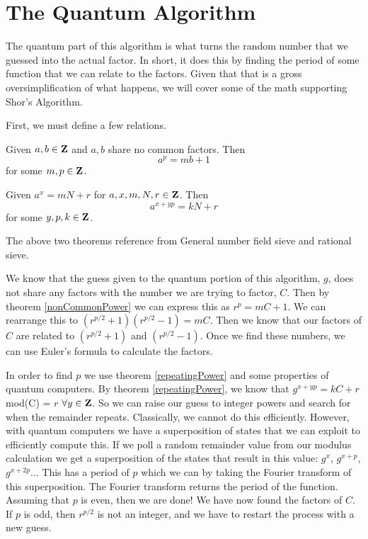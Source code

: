 \documentclass[a4paper]{article}
\begin{document}
\section{The Quantum Algorithm}
\label{quantumSec}

The quantum part of this algorithm is what turns the random number that we guessed into the actual factor. In short, it does this by finding the period of some function that we can relate to the factors. Given that that is a gross oversimplification of what happens, we will cover some of the math supporting Shor's Algorithm. 

First, we must define a few relations. 


\begin{theorem}

Given $a,b \in \mathbf{Z}$ and $a,b$ share no common factors. Then 
$$a^p = mb + 1$$
for some $m,p \in \mathbf{Z}$.
\label{nonCommonPower}
\end{theorem}

\begin{theorem} 

Given $a^x = mN + r$ for $a,x,m,N,r \in \mathbf{Z}$. Then
$$a^{x + yp} = kN + r$$
for some $y,p,k \in \mathbf{Z}$.
\label{repeatingPower}
\end{theorem}

The above two theorems reference from General number field sieve and rational sieve.

We know that the guess given to the quantum portion of this algorithm, $g$, does not share any factors with the number we are trying to factor, $C$. Then by theorem \ref{nonCommonPower} we can express this as $r^p = mC + 1$. We can rearrange this to $(r^{p/2} + 1)(r^{p/2} - 1) = mC$. Then we know that our factors of $C$ are related to $(r^{p/2} + 1)$ and $(r^{p/2} - 1)$. Once we find these numbers, we can use Euler's formula to calculate the factors. 

In order to find $p$ we use theorem \ref{repeatingPower} and some properties of quantum computers. By theorem \ref{repeatingPower}, we know that $g^{x + yp} = kC + r$ mod(C) = $r$ $\forall y \in \mathbf{Z}$. So we can raise our guess to integer powers and search for when the remainder repeats. Classically, we cannot do this efficiently. However, with quantum computers we have a superposition of states that we can exploit to efficiently compute this. If we poll a random remainder value from our modulus calculation we get a superposition of the states that result in this value: $g^{x}$, $g^{x + p}$, $g^{x+2p}$... This has a period of $p$ which we can by taking the Fourier transform of this superposition. The Fourier transform returns the period of the function. Assuming that $p$ is even, then we are done! We have now found the factors of $C$. If $p$ is odd, then $r^{p/2}$ is not an integer, and we have to restart the process with a new guess. 
\end{document}
